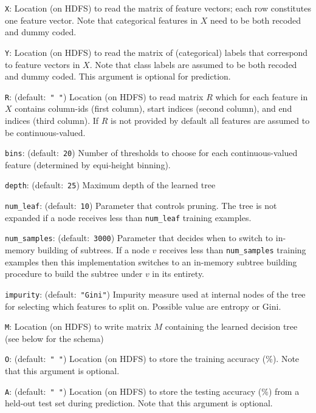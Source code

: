  
\begin{Description}
	\item[{\tt X}:]
	Location (on HDFS) to read the matrix of feature vectors; 
	each row constitutes one feature vector. Note that categorical features in $X$ need to be both recoded and dummy coded.
	\item[{\tt Y}:]
	Location (on HDFS) to read the matrix of (categorical) 
	labels that correspond to feature vectors in $X$. Note that class labels are assumed to be both recoded and dummy coded. 
	This argument is optional for prediction. 
	\item[{\tt R}:] (default:\mbox{ }{\tt " "})
	Location (on HDFS) to read matrix $R$ which for each feature in $X$ contains column-ids (first column), start indices (second column), and end indices (third column).
	If $R$ is not provided by default all features are assumed to be continuous-valued.   
	\item[{\tt bins}:] (default:\mbox{ }{\tt 20})
	Number of thresholds to choose for each continuous-valued feature (determined by equi-height binning). 
	\item[{\tt depth}:] (default:\mbox{ }{\tt 25})
	Maximum depth of the learned tree
	\item[{\tt num\_leaf}:] (default:\mbox{ }{\tt 10})
	Parameter that controls pruning. The tree
	is not expanded if a node receives less than {\tt num\_leaf} training examples.
	\item[{\tt num\_samples}:] (default:\mbox{ }{\tt 3000})
	Parameter that decides when to switch to in-memory building of subtrees. If a node $v$ receives less than {\tt num\_samples}
	training examples then this implementation switches to an in-memory subtree
	building procedure to build the subtree under $v$ in its entirety.
	\item[{\tt impurity}:] (default:\mbox{ }{\tt "Gini"})
	Impurity measure used at internal nodes of the tree for selecting which features to split on. Possible value are entropy or Gini.
	\item[{\tt M}:] 
	Location (on HDFS) to write matrix $M$ containing the learned decision tree (see below for the schema) 
	\item[{\tt O}:] (default:\mbox{ }{\tt " "})
	Location (on HDFS) to store the training accuracy (\%). Note that this argument is optional.
	\item[{\tt A}:] (default:\mbox{ }{\tt " "})
	Location (on HDFS) to store the testing accuracy (\%) from a 
	held-out test set during prediction. Note that this argument is optional.

\end{Description}
